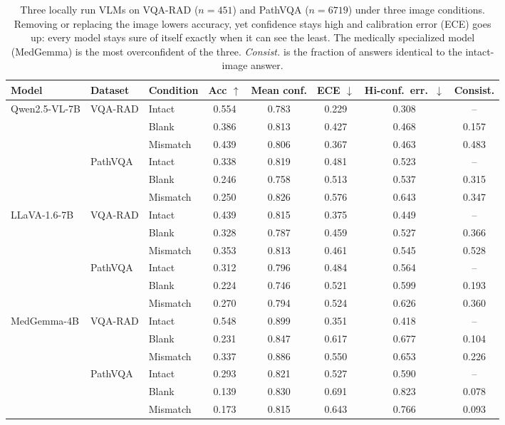 \documentclass{article}
\begin{document}
\begin{table}[t]
\centering
\caption{Three locally run VLMs on VQA-RAD ($n{=}451$) and PathVQA ($n{=}6719$) under
three image conditions. Removing or replacing the image lowers accuracy, yet
confidence stays high and calibration error (ECE) goes up: every model stays sure
of itself exactly when it can see the least. The medically specialized model
(MedGemma) is the most overconfident of the three. \emph{Consist.} is the fraction
of answers identical to the intact-image answer.}
\label{tab:main}
\small
\setlength{\tabcolsep}{3.5pt}
\begin{tabular}{lllccccc}
\toprule
Model & Dataset & Condition & Acc $\uparrow$ & Mean conf. & ECE $\downarrow$ & Hi-conf.\ err.\ $\downarrow$ & Consist. \\
\midrule
\multirow{6}{*}{Qwen2.5-VL-7B}
 & \multirow{3}{*}{VQA-RAD}
   & Intact   & 0.554 & 0.783 & 0.229 & 0.308 & --    \\
 & & Blank    & 0.386 & 0.813 & 0.427 & 0.468 & 0.157 \\
 & & Mismatch & 0.439 & 0.806 & 0.367 & 0.463 & 0.483 \\
\cmidrule(l){2-8}
 & \multirow{3}{*}{PathVQA}
   & Intact   & 0.338 & 0.819 & 0.481 & 0.523 & --    \\
 & & Blank    & 0.246 & 0.758 & 0.513 & 0.537 & 0.315 \\
 & & Mismatch & 0.250 & 0.826 & 0.576 & 0.643 & 0.347 \\
\midrule
\multirow{6}{*}{LLaVA-1.6-7B}
 & \multirow{3}{*}{VQA-RAD}
   & Intact   & 0.439 & 0.815 & 0.375 & 0.449 & --    \\
 & & Blank    & 0.328 & 0.787 & 0.459 & 0.527 & 0.366 \\
 & & Mismatch & 0.353 & 0.813 & 0.461 & 0.545 & 0.528 \\
\cmidrule(l){2-8}
 & \multirow{3}{*}{PathVQA}
   & Intact   & 0.312 & 0.796 & 0.484 & 0.564 & --    \\
 & & Blank    & 0.224 & 0.746 & 0.521 & 0.599 & 0.193 \\
 & & Mismatch & 0.270 & 0.794 & 0.524 & 0.626 & 0.360 \\
\midrule
\multirow{6}{*}{MedGemma-4B}
 & \multirow{3}{*}{VQA-RAD}
   & Intact   & 0.548 & 0.899 & 0.351 & 0.418 & --    \\
 & & Blank    & 0.231 & 0.847 & 0.617 & 0.677 & 0.104 \\
 & & Mismatch & 0.337 & 0.886 & 0.550 & 0.653 & 0.226 \\
\cmidrule(l){2-8}
 & \multirow{3}{*}{PathVQA}
   & Intact   & 0.293 & 0.821 & 0.527 & 0.590 & --    \\
 & & Blank    & 0.139 & 0.830 & 0.691 & 0.823 & 0.078 \\
 & & Mismatch & 0.173 & 0.815 & 0.643 & 0.766 & 0.093 \\
\bottomrule
\end{tabular}
\end{table}
\end{document}
